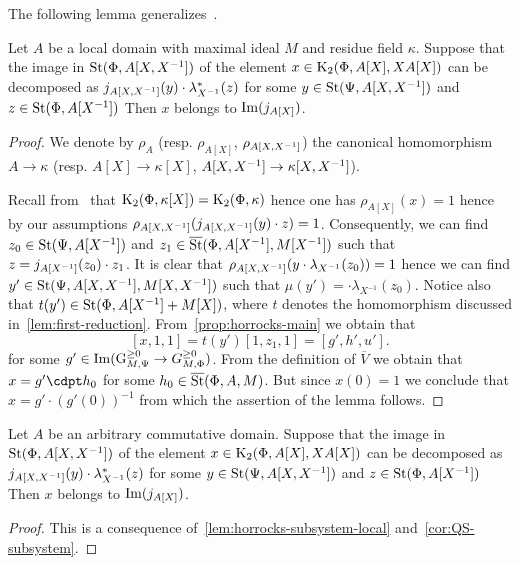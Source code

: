 The following lemma generalizes~\cite[Proposition~4.3(b)]{Tu83}.
\begin{lemma} \label{lem:horrocks-subsystem-local}
Let $A$ be a local domain with maximal ideal $M$ and residue field $\kappa$.
Suppose that the image in $\operatorname{St}(\Phi, A[X, X^{-1}])$ of the element $x \in \operatorname{K}_2(\Phi, A[X], XA[X])$
 can be decomposed as $j_{A[X, X^{-1}]}(y) \cdot \lambda_{X^{-1}}^*(z)$ for
 some $y \in \operatorname{St}(\Psi, A[X, X^{-1}])$ and $z \in \operatorname{St}(\Phi, A[X^{-1}])$
Then $x$ belongs to $\operatorname{Im}(j_{A[X]})$.
\end{lemma}
\begin{proof}
    We denote by $\rho_{A}$ (resp. $\rho_{A[X]}$, $\rho_{A[X, X^{-1}]}$) the canonical homomorphism
     $A \to \kappa$ (resp. $A[X] \to \kappa[X]$, $A[X, X^{-1}] \to \kappa[X, X^{-1}]$).

    Recall from~\cite{Hur77} that $\operatorname{K}_2(\Phi, \kappa[X]) = \operatorname{K}_2(\Phi, \kappa)$ hence one has $\rho_{A[X]}(x) = 1$
     hence by our assumptions $\rho_{A[X, X^{-1}]}(j_{A[X, X^{-1}]}(y) \cdot z) = 1$.
    Consequently, we can find $z_0 \in \operatorname{St}(\Psi, A[X^{-1}])$ and $z_1 \in \overline{\operatorname{St}}(\Phi, A[X^{-1}], M[X^{-1}])$
     such that $z = j_{A[X^{-1}]}(z_0) \cdot z_1$.
    It is clear that $\rho_{A[X, X^{-1}]}(y \cdot \lambda_{X^{-1}}(z_0)) = 1$ hence we can find
     $y' \in \operatorname{St}(\Psi, A[X, X^{-1}], M[X, X^{-1}])$ such that $\mu(y') = \cdot \lambda_{X^{-1}}(z_0)$.
    Notice also that $t(y') \in \operatorname{St}(\Phi, A[X^{-1}] + M[X])$, where $t$ denotes the homomorphism discussed in~\cref{lem:first-reduction}.
    From~\cref{prop:horrocks-main} we obtain that
    \[ [x, 1, 1 ] = t(y') [1, z_1, 1] = [g', h', u']. \]
    for some $g' \in \operatorname{Im}(\operatorname{G}_{M, \Psi}^{\geq 0} \to G_{M, \Phi}^{\geq 0})$.
    From the definition of $\overline{V}$ we obtain that $x = g' \cdpt h_0$ for some $h_0 \in \overline{\operatorname{St}}(\Phi, A, M)$.
    But since $x(0) = 1$ we conclude that $x = g' \cdot (g'(0))^{-1}$ from which the assertion of the lemma follows.
\end{proof}

\begin{cor} \label{cor:horrocks--ingredient}
    Let $A$ be an arbitrary commutative domain.
    Suppose that the image in $\operatorname{St}(\Phi, A[X, X^{-1}])$ of the element $x \in \operatorname{K}_2(\Phi, A[X], XA[X])$
    can be decomposed as $j_{A[X, X^{-1}]}(y) \cdot \lambda_{X^{-1}}^*(z)$ for
    some $y \in \operatorname{St}(\Psi, A[X, X^{-1}])$ and $z \in \operatorname{St}(\Phi, A[X^{-1}])$
    Then $x$ belongs to $\operatorname{Im}(j_{A[X]})$.
\end{cor}
\begin{proof}
    This is a consequence of~\cref{lem:horrocks-subsystem-local} and~\cref{cor:QS-subsystem}.
\end{proof}


